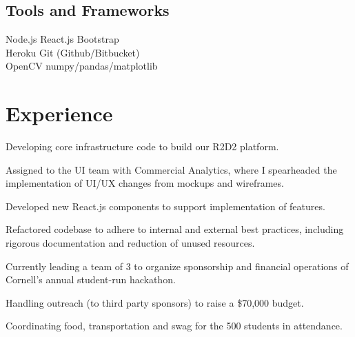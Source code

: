 \documentclass[]{deedy-resume-openfont}
\begin{document}
\begin{minipage}[t]{0.33\textwidth}
\subsection{Tools and Frameworks}
Node.js \textbullet{}   React.js \textbullet{} 
Bootstrap \textbullet{} \\
Heroku \textbullet{} 
Git (Github/Bitbucket) \\
OpenCV \textbullet numpy/pandas/matplotlib

\sectionsep




%
%

\end{minipage} 
\hfill
\begin{minipage}[t]{0.66\textwidth} 


\section{Experience}

\vspace{\topsep} %
\begin{tightemize}
\item Developing core infrastructure code to build our R2D2 platform.
\end{tightemize}
\sectionsep

\begin{tightemize}
\item Assigned to the UI team with Commercial Analytics, where I spearheaded the implementation of UI/UX changes from mockups and wireframes.
\item Developed new React.js components to support implementation of features.
\item Refactored codebase to adhere to internal and external best practices, including rigorous documentation and reduction of unused resources.
\end{tightemize}
\sectionsep




\begin{tightemize}
\item Currently leading a team of 3 to organize sponsorship and financial operations of Cornell's annual student-run hackathon.
\item Handling outreach (to third party sponsors) to raise a \$70,000 budget.
\item Coordinating food, transportation and swag for the 500 students in attendance.
\end{tightemize}
\sectionsep



\end{minipage}
\end{document}
